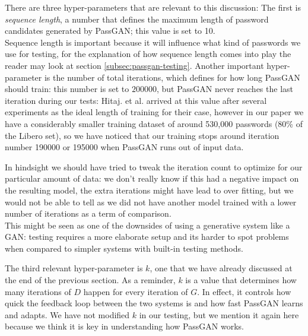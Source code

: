 There are three hyper-parameters that are relevant to this discussion: The first is \emph{sequence length}, a number that defines the maximum length of password candidates generated by PassGAN; this value is set to 10.\\ 
Sequence length is important because it will influence what kind of passwords we use for testing, for the explanation of how sequence length comes into play the reader may look at section \ref{subsec:passgan-testing}.
Another important hyper-parameter is the number of total iterations, which defines for how long PassGAN should train: this number is set to $200000$, but PassGAN never reaches the last iteration during our tests: Hitaj. et al. arrived at this value after several experiments as the ideal length of training for their case, however in our paper we have a considerably smaller training dataset of around 530,000 passwords (80\% of the Libero set), so we have noticed that our training stops around iteration number 190000 or 195000 when PassGAN runs out of input data.

In hindsight we should have tried to tweak the iteration count to optimize for our particular amount of data: we don't really know if this had a negative impact on the resulting model, the extra iterations might have lead to over fitting, but we would not be able to tell as we did not have another model trained with a lower number of iterations as a term of comparison.\\
This might be seen as one of the downsides of using a generative system like a GAN: testing requires a more elaborate setup and its harder to spot problems when compared to simpler systems with built-in testing methods. 

The third relevant hyper-parameter is $k$, one that we have already discussed at the end of the previous section. As a reminder, $k$ is a value that determines how many iterations of $D$ happen for every iteration of $G$. In effect, it controls how quick the feedback loop between the two systems is and how fast PassGAN learns and adapts. We have not modified $k$ in our testing, but we mention it again here because we think it is key in understanding how PassGAN works. 
